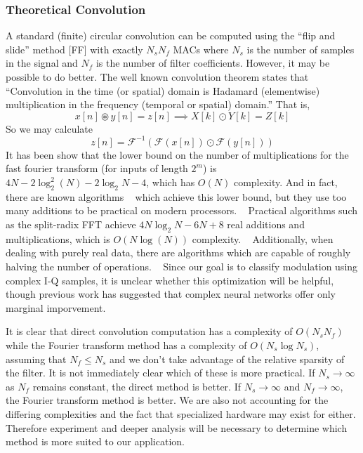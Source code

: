 \subsubsection{Theoretical Convolution}
A standard (finite) circular convolution can be computed using the ``flip and slide'' method [FF] with exactly $N_s N_f$ MACs where $N_s$ is the number of samples in the signal and $N_f$ is the number of filter coefficients.  However, it may be possible to do better.
The well known convolution theorem states that ``Convolution in the time (or spatial) domain is Hadamard (elementwise) multiplication in the frequency (temporal or spatial) domain.''  That is,
$$ x[n]\circledast y[n] = z[n] \implies X[k] \odot Y[k] = Z[k]$$
So we may calculate
$$ z[n] = \mathcal{F}^{-1}(\mathcal{F}(x[n]) \odot \mathcal{F}(y[n]))$$
It has been show that the lower bound on the number of multiplications for the fast fourier transform (for inputs of length $2^m$) is $ 4N - 2\log_2^2(N) - 2\log_2N - 4$, which has $O(N)$ complexity.  And in fact, there are known algorithms ~\cite{Winograd} which achieve this lower bound, but they use too many additions to be practical on modern processors. ~\cite{Duhamel:1990:FFT:78772.78773}  Practical algorithms such as the split-radix FFT achieve $4N\log_2{N} - 6N + 8$ real additions and multiplications, which is $O(N\log(N))$ complexity. ~\cite{Yavne:1968:EMC:1476589.1476610}  Additionally, when dealing with purely real data, there are algorithms which are capable of roughly halving the number of operations. ~\cite{Bergland:1968:NAF:364096.364118} Since our goal is to classify modulation using complex I-Q samples, it is unclear whether this optimization will be helpful, though previous work has suggested that complex neural networks offer only marginal imporvement. ~\cite{DBLP:journals/corr/TrabelsiBSSSMRB17}

It is clear that direct convolution computation has a complexity of $O(N_sN_f)$ while the Fourier transform method has a complexity of $O(N_s\log N_s)$, assuming that $N_f \leq N_s$ and we don't take advantage of the relative sparsity of the filter.  It is not immediately clear which of these is more practical.  If $N_s \rightarrow \infty$ as $N_f$ remains constant, the direct method is better.  If $N_s \rightarrow \infty$ and $N_f \rightarrow \infty$, the Fourier transform method is better.  We are also not accounting for the differing complexities and the fact that specialized hardware may exist for either.  Therefore experiment and deeper analysis will be necessary to determine which method is more suited to our application.

